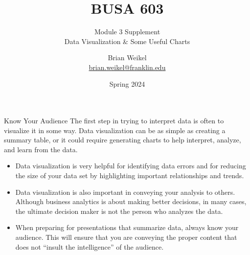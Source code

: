 \documentclass[pdf]{beamer}
\title{BUSA 603}
\subtitle{Module 3 Supplement \\  Data Visualization \& Some Useful Charts}
\theoremstyle{remark}
\theoremstyle{definition}
\begin{document}
\author[B. Weikel, Franklin University]{
	\begin{tabular}{c} 
	\Large
	Brian Weikel\\
    \footnotesize \href{mailto:brian.weikel@franklin.edu}{brian.weikel@franklin.edu}
    \vspace{1ex}
\end{tabular}
\vspace{-4ex}}


\date{Spring 2024}%

\begin{noheadline}
\begin{frame}[t]\maketitle\end{frame}
\end{noheadline}

\begin{frame}[t]{Know Your Audience}
The first step in trying to interpret data is often to visualize it in some way. Data visualization can be as simple as creating a summary table, or it could require generating charts to help interpret, analyze, and learn from the data. \\
\vspace{0.5ex} 
\small
\begin{itemize}
\item Data visualization is very helpful for  identifying data errors and for reducing the size of your data set by highlighting important relationships and trends. \\
\item Data visualization is also important in conveying your analysis to others. Although business analytics is about making better decisions, in many cases, the ultimate decision maker is not the person who analyzes the data. 
\item When preparing for presentations that summarize data, always know your audience.  This will ensure that you are conveying the proper content that does not ``insult the intelligence'' of the audience. 
\end{itemize}
\end{frame}
\end{document}
